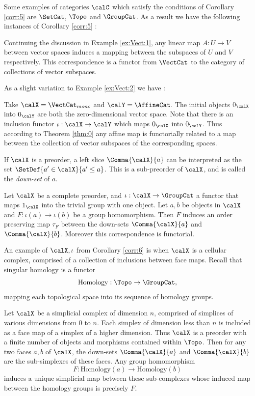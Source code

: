 \documentclass[12pt,oneside]{article}
\begin{document}
Some examples of categories $\calC$ which satisfy the conditions of Corollary \ref{corr:5} are $\SetCat$, $\Topo$ and $\GroupCat$. As a result we have the following instances of Corollary \ref{corr:5} :

\begin{example} \label{ex:Vect:2}
	Continuing the discussion in Example \ref{ex:Vect:1}, any linear map $A: U\to V$ between vector spaces induces a mapping between the subspaces of $U$ and $V$ respectively. This correspondence is a functor from $\VectCat$ to the category of collections of vector subspaces.
\end{example}

As a slight variation to Example \ref{ex:Vect:2} we have :

\begin{example} \label{ex:Vect:3}
	Take $\calX = \VectCat_{mono}$ and $\calY = \AffineCat$. The initial objects $0_\calX$ into $0_{\calY}$ are both the zero-dimensional vector space. Note that there is an inclusion functor $\iota : \calX \to \calY$ which maps $0_\calX$ into $0_{\calY}$. Thus according to Theorem \ref{thm:0} any affine map is functorially related to a map between the collection of vector subspaces of the corresponding spaces.
\end{example}

If $\calX$ is a preorder, a left slice $\Comma{\calX}{a}$ can be interpreted as the set $\SetDef{a' \in \calX}{ a'\leq a }$. This is a sub-preorder of $\calX$, and is called the \emph{down-set} of $a$.

\begin{corollary} \label{corr:6}
	Let $\calX$ be a complete preorder, and $\iota : \calX \to \GroupCat$ a functor that maps $1_{\calX}$ into the trivial group with one object. Let $a,b$ be objects in $\calX$ and $F: \iota(a) \to \iota(b)$ be a group homomorphism. Then $F$ induces an order preserving map $\tau_F$ between the down-sets $\Comma{\calX}{a}$ and $\Comma{\calX}{b}$. Moreover this correspondence is functorial.
\end{corollary}

An example of $\calX, \iota$ from Corollary \ref{corr:6} is when $\calX$ is a cellular complex, comprised of a collection of inclusions between face maps. Recall that singular homology is a functor
%
\[ \text{Homology} : \Topo \to \GroupCat , \]
%
mapping each topological space into its sequence of homology groups.

\begin{example} \label{ex:topo:1}
	Let $\calX$ be a simplicial complex of dimension $n$, comprised of simplices of various dimensions from $0$ to $n$. Each simplex of dimension less than $n$ is included as a face map of a simplex of a higher dimension. Thus $\calX$ is a preorder with a finite number of objects and morphisms contained within $\Topo$. Then for any two faces $a, b$ of $\calX$, the down-sets $\Comma{\calX}{a}$ and $\Comma{\calX}{b}$ are the sub-simplexes of these faces. Any group homomorphism
	\[ F : \text{Homology}(a) \to \text{Homology}(b) \]
	induces a unique simplicial map between these sub-complexes whose induced map between the homology groups is precisely $F$.
\end{example}
\end{document}
